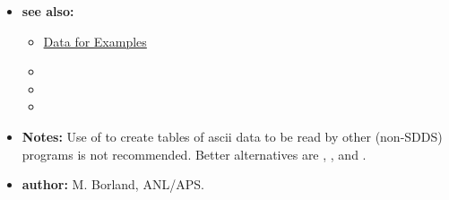 \begin{itemize}
\begin{itemize}
    \end{itemize}
\item {\bf see also:}
        \begin{itemize}
        \item \hyperref[exampleData]{Data for Examples}
        \item {}
        \item {}
        \item {}
        \end{itemize}
\item {\bf Notes:} Use of  to create tables of ascii data to be read by other (non-SDDS) programs is not recommended.
  Better alternatives are , , and .
\item {\bf author:} M. Borland, ANL/APS.
\end{itemize}


